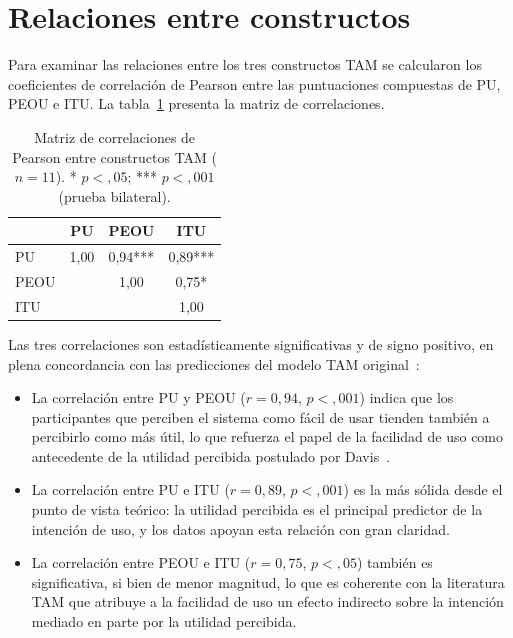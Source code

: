 \section{Relaciones entre constructos}\label{sec:correlaciones}

Para examinar las relaciones entre los tres constructos TAM se calcularon los coeficientes de correlación de Pearson entre las puntuaciones compuestas de PU, PEOU e ITU. La tabla~\ref{tab:correlaciones} presenta la matriz de correlaciones.

\begin{table}[h!]
\centering
\caption{Matriz de correlaciones de Pearson entre constructos TAM ($n = 11$). \newline
* $p < {,}05$; *** $p < {,}001$ (prueba bilateral).}
\label{tab:correlaciones}
\begin{tabular}{@{} l c c c @{}}
\hline
\rule{0pt}{10pt} & \textbf{PU} & \textbf{PEOU} & \textbf{ITU} \\
\hline
\rule{0pt}{10pt}PU   & 1{,}00      & 0{,}94*** & 0{,}89*** \\
PEOU &            & 1{,}00    & 0{,}75*   \\
ITU  &            &           & 1{,}00    \\
\hline
\end{tabular}
\end{table}

Las tres correlaciones son estadísticamente significativas y de signo positivo, en plena concordancia con las predicciones del modelo TAM original~\cite{davis1989tam}:

\begin{itemize}
  \item La correlación entre PU y PEOU ($r = 0{,}94$, $p < {,}001$) indica que los participantes que perciben el sistema como fácil de usar tienden también a percibirlo como más útil, lo que refuerza el papel de la facilidad de uso como antecedente de la utilidad percibida postulado por Davis~\cite{davis1989tam}.
  \item La correlación entre PU e ITU ($r = 0{,}89$, $p < {,}001$) es la más sólida desde el punto de vista teórico: la utilidad percibida es el principal predictor de la intención de uso, y los datos apoyan esta relación con gran claridad.
  \item La correlación entre PEOU e ITU ($r = 0{,}75$, $p < {,}05$) también es significativa, si bien de menor magnitud, lo que es coherente con la literatura TAM que atribuye a la facilidad de uso un efecto indirecto sobre la intención mediado en parte por la utilidad percibida.
\end{itemize}

